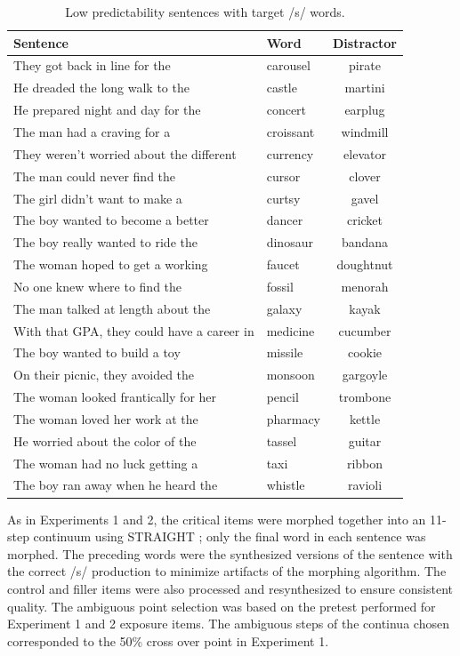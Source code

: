 \begin{table}[!ht]
\caption{Low predictability sentences with target /s/ words.}
\label{tbl:sentlows}
\small
\centering
\begin{tabular}{llc}
\toprule
Sentence                                                                     & Word        & Distractor  \\
\midrule
They got back in line for the & carousel & pirate \\
He dreaded the long walk to the & castle & martini \\
He prepared night and day for the & concert & earplug \\
The man had a craving for a & croissant & windmill \\
They weren't worried about the different & currency & elevator \\
The man could never find the & cursor & clover \\
The girl didn't want to make a & curtsy & gavel \\
The boy wanted to become a better & dancer & cricket \\
The boy really wanted to ride the & dinosaur & bandana \\
The woman hoped to get a working & faucet & doughtnut \\
No one knew where to find the & fossil & menorah \\
The man talked at length about the & galaxy & kayak \\
With that GPA, they could have a career in & medicine & cucumber \\
The boy wanted to build a toy & missile & cookie \\
On their picnic, they avoided the & monsoon & gargoyle \\
The woman looked frantically for her & pencil & trombone \\
The woman loved her work at the & pharmacy & kettle \\
He worried about the color of the & tassel & guitar \\
The woman had no luck getting a & taxi & ribbon \\
The boy ran away when he heard the & whistle & ravioli \\
\bottomrule
\end{tabular}
\end{table}

As in Experiments 1 and 2, the critical items were morphed together into an 11-step continuum using STRAIGHT \citep{Kawahara2008}; only the final word in each sentence was morphed. 
The preceding words were the synthesized versions of the sentence with the correct /s/ production to minimize artifacts of the morphing algorithm.  
The control and filler items were also processed and resynthesized to ensure consistent quality.  
The ambiguous point selection was based on the pretest performed for Experiment 1 and 2 exposure items.  
The ambiguous steps of the continua chosen corresponded to the 50\% cross over point in Experiment 1.

